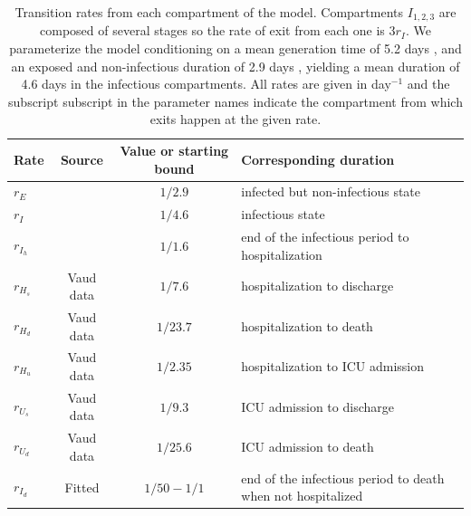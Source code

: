 \begin{table}[ht!]
\centering
\caption[Transition rates from each compartment of the model]{Transition rates from each compartment of the model. Compartments $I_{1,2,3}$ are composed of several stages so the rate of exit from each one is $3r_{I}$. We parameterize the model conditioning on a mean generation time of 5.2 days \parencite{Ganyani:EstimatingGenerationInterval:2020}, and an exposed and non-infectious duration of 2.9 days \parencite{He:TemporalDynamicsViral:2020}, yielding a mean duration of 4.6 days in the infectious compartments. All rates are given in day$^{-1}$ and the subscript subscript in the parameter names indicate the compartment from which exits happen at the given rate.}
\begin{tabular}{lccl}
\toprule
Rate & Source & Value or starting bound & Corresponding duration  \\
\midrule
$r_{E}$ & \parencite{He:TemporalDynamicsViral:2020} & $1/2.9$& infected but non-infectious state \\
$r_{I}$ & \parencite{He:TemporalDynamicsViral:2020, Ganyani:EstimatingGenerationInterval:2020}  & $1/4.6$  & infectious state\\
$r_{I_h}$ & \parencite{Scire:ReproductiveNumberCOVID19:2020} & $1/1.6$& end of the infectious period to hospitalization \\
$r_{H_s}$ & Vaud data & $1/7.6$ & hospitalization to discharge \\
$r_{H_d}$ & Vaud data & $1/23.7$ & hospitalization to death \\
$r_{H_u}$ & Vaud data & $1/2.35$  & hospitalization to ICU admission \\
$r_{U_s}$ & Vaud data & $1/9.3$  & ICU admission to discharge \\
$r_{U_d}$ & Vaud data & $1/25.6$ & ICU admission to death \\
$r_{I_d}$ & Fitted & $1/50 - 1/1$ &end of the infectious period to death when not hospitalized \\
\bottomrule
\end{tabular}
\label{parRates}
\end{table}

